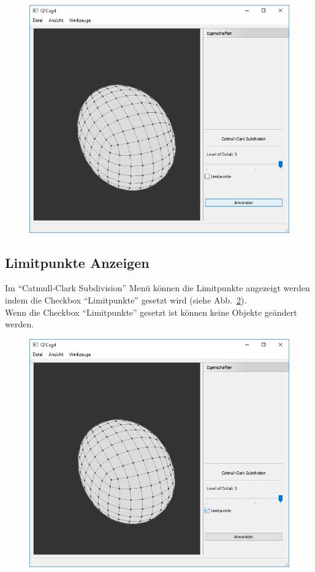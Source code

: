 \begin{figure}[H]
	\centering
	\includegraphics[scale=0.5]{content/pictures/8-MeshCatmullClark}
	\caption{}
	\label{fig:MeshCatmullClark}
\end{figure}

\subsection{Limitpunkte Anzeigen}
Im "`Catmull-Clark Subdivision"' Menü können die Limitpunkte angezeigt werden indem die Checkbox "`Limitpunkte"' gesetzt wird (siehe Abb.~\ref{fig:Limitpunkte}).\\
Wenn die Checkbox "`Limitpunkte"' gesetzt ist können keine Objekte geändert werden.

\begin{figure}[H]
	\centering
	\includegraphics[scale=0.5]{content/pictures/9-Limitpunkte}
	\caption{}
	\label{fig:Limitpunkte}
\end{figure}

